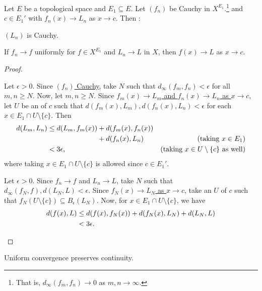 	
	\begin{prp}
		Let $E$ be a topological space and $E_1\subseteq E$. Let $(f_n)$ be Cauchy in $X^{E_1}$.\footnote{
			That is, $d_\infty(f_m, f_n)\to 0$ as $m, n\to\infty$.
		} and $c\in E_1'$ with $f_n(x)\to L_n$ as $x\to c$. Then \tfh:
		\begin{mylist}
			\item $(L_n)$ is Cauchy.
			
			\item If $f_n\to f$ uniformly for $f\in X^{E_1}$ and $L_n\to L$ in $X$, then $f(x)\to L$ as $x\to c$.
		\end{mylist}
	\end{prp}
	
	\begin{proof}
		\begin{mylist}
			\item Let $\epsilon > 0$. Since \uline{$(f_n)$ Cauchy}, take $N$ such that $d_\infty(f_m, f_n) < \epsilon$ for all $m, n\ge N$. Now, let $m, n\ge N$. Since \uline{$f_m(x)\to L_m$ and $f_n(x)\to L_n$ as $x\to c$}, let $U$ be an \onbd of $c$ such that $d(f_m(x), L_m), d(f_n(x), L_n) < \epsilon$ for each $x\in E_1\cap U\setminus\{c\}$. Then
			\begin{alignat*}{2}
				d(L_m, L_n)
				& \le d(L_m, f_m(x)) + d(f_m(x), f_n(x)) \\
				& \phantom{{}\le d(L_m, f_m(x))} + d(f_n(x), L_n) & \text{(taking $x\in E_1$)}\\
				& < 3\epsilon\text, & \text{(taking $x\in U\setminus \{c\}$ as well)}
			\end{alignat*}
			where taking $x\in E_1\cap U\setminus\{c\}$ is allowed since \uline{$c\in E_1'$}.
			
			
			\item Let $\epsilon > 0$. Since \uline{$f_n\to f$} and \uline{$L_n\to L$}, take $N$ such that $d_\infty(f_N, f), d(L_N, L) < \epsilon$. Since \uline{$f_N(x)\to L_N$ as $x\to c$}, take an \onbd $U$ of $c$ such that $f_N(U\setminus\{c\})\subseteq B_\epsilon(L_N)$. Now, for $x\in E_1\cap U\setminus\{c\}$, we have
			\begin{alignat*}{2}
				d(f(x), L)
				& \le d(f(x), f_N(x)) + d(f_N(x), L_N) + d(L_N, L)\\
				& < 3\epsilon\text. \tag*{\qedhere}
			\end{alignat*}
		\end{mylist}
	\end{proof}
	
	\begin{cor}
		Uniform convergence preserves continuity.
	\end{cor}
	
